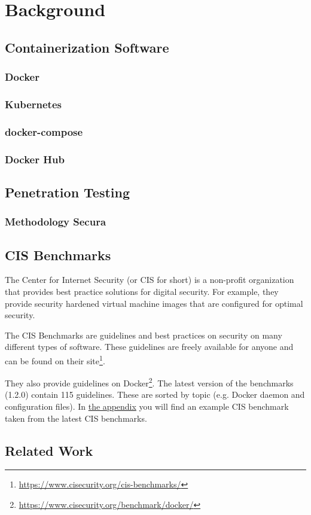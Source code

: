 \chapter{Background}

\section{Containerization Software}
\subsection{Docker}
\subsection{Kubernetes}
\subsection{docker-compose}
\subsection{Docker Hub}
\section{Penetration Testing}
\subsection{Methodology Secura}

\section{CIS Benchmarks}
The Center for Internet Security (or CIS for short) is a non-profit organization that provides best practice solutions for digital security. For example, they provide security hardened virtual machine images that are configured for optimal security.

\hfill

The CIS Benchmarks are guidelines and best practices on security on many different types of software. These guidelines are freely available for anyone and can be found on their site\footnote{\url{https://www.cisecurity.org/cis-benchmarks/}}.

\hfill

They also provide guidelines on Docker\footnote{\url{https://www.cisecurity.org/benchmark/docker/}}. The latest version of the benchmarks (1.2.0) contain 115 guidelines. These are sorted by topic (e.g. Docker daemon and configuration files). In \hyperref[appendix:a]{the appendix} you will find an example CIS benchmark taken from the latest CIS benchmarks.

\section{Related Work}
